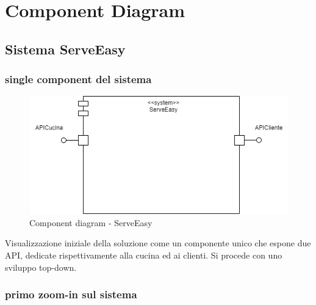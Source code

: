 \section{Component Diagram}
\subsection{Sistema ServeEasy}
\subsubsection{single component del sistema}
\begin{figure}[H]
	\centering
	\includegraphics[scale=0.6]{iterazione1/images/ServeEasy_componente_unico.jpg}
	\caption{Component diagram - ServeEasy\label{fig:component_diagram_serveeasy}}
\end{figure}
Visualizzazione iniziale della soluzione come un componente unico che espone due API, dedicate rispettivamente alla cucina ed ai clienti. Si procede con uno sviluppo top-down.

\subsubsection{primo zoom-in sul sistema}

